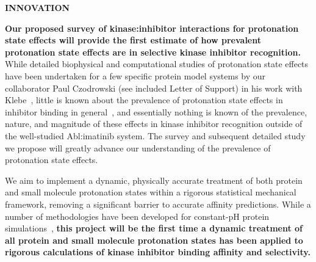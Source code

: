 \documentclass[11pt]{article}
\begin{document}
%



{\large \bf INNOVATION}

{\bf Our proposed survey of kinase:inhibitor interactions for protonation state effects will provide the first estimate of how prevalent  protonation state effects are in selective kinase inhibitor recognition.}
While detailed biophysical and computational studies of protonation state effects have been undertaken for a few specific protein model systems by our collaborator Paul Czodrowski (see included Letter of Support) in his work with Klebe~\cite{klebe:2001:jmb:trypsin-thrombin,klebe:chembiochem:2002:ph-dependent-binding-modes,klebe:jmb:2007:protonation-state-changes,klebe:jmb:2007:factorizing-binding-affinity}, little is known about the prevalence of protonation state effects in inhibitor binding in general~\cite{onufriev:quart-rev-biophys:2013:protonation-state-effects}, and essentially nothing is known of the prevalence, nature, and magnitude of these effects in kinase inhibitor recognition outside of the well-studied Abl:imatinib system.
The survey and subsequent detailed study we propose will greatly advance our understanding of the prevalence of protonation state effects.

We aim to implement a dynamic, physically accurate treatment of both protein and small molecule protonation states within a rigorous statistical mechanical framework, removing a significant barrier to accurate affinity predictions.
While a number of methodologies have been developed for constant-pH protein simulations~\cite{gunner:biophys-j:1997:mcce,gunner:biophys-j:2002:mcce,mongan:2004:j-comput-chem:constant-pH,gunner:j-comput-chem:2009:mcce2,stern:jcp:2007:constant-pH,dashi-meng-roitberg:jpcb:2012:ph-remd,brooks:proteins:2014:constant-ph-explicit,khandogin-brooks:biophys-j:2005:constant-ph,stern:jcp:2007:constant-pH,grubmueller:biophys-j:2011:constant-pH-lambda-dynamics,roux:jctc:2015:constant-pH-ncmc}, {\bf this project will be the first time a dynamic treatment of all protein and small molecule protonation states has been applied to rigorous calculations of kinase inhibitor binding affinity and selectivity.} 
\end{document}
